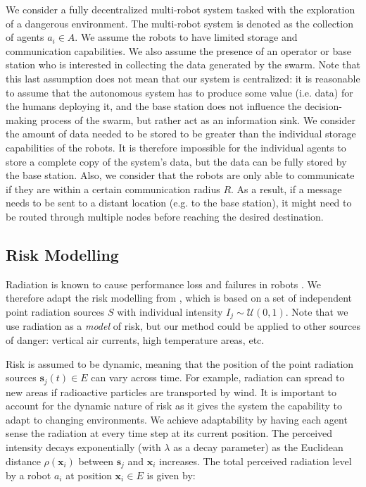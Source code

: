 \documentclass[letterpaper, 10 pt, conference]{ieeeconf}
\begin{document}
We consider a fully decentralized multi-robot system tasked with the
exploration of a dangerous environment. The multi-robot system is denoted as the collection 
of agents $a_i \in A$. We assume the robots to have limited storage and communication 
capabilities. We also assume the presence of an operator or base station who is interested 
in collecting the data generated by the swarm. Note that this last assumption does not mean 
that our system is centralized: it is reasonable to assume that the autonomous system has 
to produce some value (i.e. data) for the humans deploying it, and the base station does 
not influence the decision-making process of the swarm, but rather act as an 
information sink. We consider the amount of data needed to be stored to be greater than the individual 
storage capabilities of the robots. It is therefore impossible for the individual agents 
to store a complete copy of the system’s data, but the data can be fully stored by the 
base station. Also, we consider that the robots are only able to communicate if they are 
within a certain communication radius $R$. As a result, if a message needs to be sent to a 
distant location (e.g. to the base station), it might need to be routed through multiple 
nodes before reaching the desired destination.


\subsection{Risk Modelling}
Radiation is known to cause performance loss and failures in robots \cite{sharp1996radiation,messenger1986effects}. We therefore adapt the risk modelling from \cite{vielfaure2021dora}, which is based on a set of independent point radiation sources $S$ with individual intensity $I_j\sim\mathcal{U}(0, 1)$. Note that we use radiation as
a \emph{model} of risk, but our method could be applied to other sources of danger:
vertical air currents, high temperature areas, etc.

Risk is assumed to be dynamic, meaning that the position of the point radiation sources $\bm{s}_j(t) \in E$ can vary across time. 
For example, radiation can spread to new areas if radioactive particles are
transported by wind. It is important to account for the dynamic nature of risk as it gives 
the system the capability to adapt to changing environments. We achieve adaptability by 
having each agent sense the radiation at every time step at its current position. The 
perceived intensity decays exponentially (with $\lambda$ as a decay parameter) as the 
Euclidean distance $\rho(\bm{x}_i)$ between $\bm{s}_j$ and $\bm{x}_i$ increases. The
total perceived radiation level by a robot $a_i$ at position $\bm{x}_i \in E$ is given by:
\end{document}
